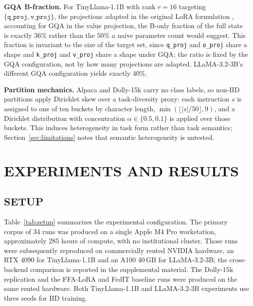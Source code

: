 \textbf{GQA B-fraction.}
For TinyLlama-1.1B with rank $r{=}16$ targeting $\{\texttt{q\_proj}, \texttt{v\_proj}\}$, the projections adapted in the original LoRA formulation \cite{hu2022lora}, accounting for GQA in the value projection, the B-only fraction of the full state is exactly 36\% rather than the 50\% a naive parameter count would suggest. This fraction is invariant to the size of the target set, since \texttt{q\_proj} and \texttt{o\_proj} share a shape and \texttt{k\_proj} and \texttt{v\_proj} share a shape under GQA; the ratio is fixed by the GQA configuration, not by how many projections are adapted. LLaMA-3.2-3B's different GQA configuration yields exactly 40\%.

\textbf{Partition mechanics.}
Alpaca and Dolly-15k carry no class labels, so non-IID partitions apply Dirichlet skew over a task-diversity proxy: each instruction $s$ is assigned to one of ten buckets by character length, $\min(\lfloor |s| / 50 \rfloor, 9)$, and a Dirichlet distribution with concentration $\alpha \in \{0.5, 0.1\}$ is applied over those buckets. This induces heterogeneity in task form rather than task semantics; Section~\ref{sec:limitations} notes that semantic heterogeneity is untested.

\section{EXPERIMENTS AND RESULTS}
\label{sec:experiments}

\subsection{SETUP}
\label{sec:setup}
Table~\ref{tab:setup} summarizes the experimental configuration. The primary corpus of 34 runs was produced on a single Apple M4 Pro workstation, approximately 285 hours of compute, with no institutional cluster. Those runs were subsequently reproduced on commercially rented NVIDIA hardware, an RTX 4090 for TinyLlama-1.1B and an A100 40\,GB for LLaMA-3.2-3B; the cross-backend comparison is reported in the supplemental material. The Dolly-15k replication and the FFA-LoRA and FedIT baseline runs were produced on the same rented hardware. Both TinyLlama-1.1B and LLaMA-3.2-3B experiments use three seeds for IID training.

